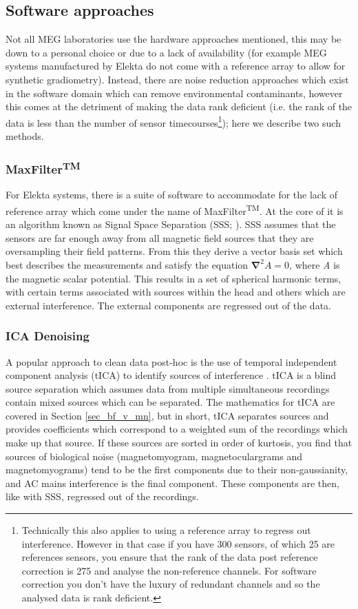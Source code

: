 \subsection{Software approaches}
Not all MEG laboratories use the hardware approaches mentioned, this may be down to a personal choice or due to a lack of availability (for example MEG systems manufactured by Elekta do not come with a reference array to allow for synthetic gradiometry). Instead, there are noise reduction approaches which exist in the software domain which can remove environmental contaminants, however this comes at the detriment of making the data rank deficient (i.e. the rank of the data is less than the number of sensor timecourses\footnote{Technically this also applies to using a reference array to regress out interference. However in that case if you have 300 sensors, of which 25 are references sensors, you ensure that the rank of the data post reference correction is 275 and analyse the non-reference channels. For software correction you don't have the luxury of redundant channels and so the analysed data is rank deficient.}); here we describe two such methods. 

\subsubsection{MaxFilter\textsuperscript{TM}}
For Elekta systems, there is a suite of software to accommodate for the lack of reference array which come under the name of MaxFilter\textsuperscript{TM}. At the core of it is an algorithm known as Signal Space Separation (SSS; \citealp{Taulu2004}). SSS assumes that the sensors are far enough away from all magnetic field sources that they are oversampling their field patterns. From this they derive a vector basis set which best describes the measurements and satisfy the equation $\mathbf{\nabla}^2A=0$, where \textit{A} is the magnetic scalar potential. This results in a set of spherical harmonic terms, with certain terms associated with sources within the head and others which are external interference. The external components are regressed out of the data. 

\subsubsection{ICA Denoising}
A popular approach to clean data post-hoc is the use of temporal independent component analysis (tICA) to identify sources of interference \citep{Mantini2007}. tICA is a blind source separation which assumes data from multiple simultaneous recordings contain mixed sources which can be separated. The mathematics for tICA are covered in Section \ref{sec_bf_v_mn}, but in short, tICA separates sources and provides coefficients which correspond to a weighted sum of the recordings which make up that source. If these sources are sorted in order of kurtosis, you find that sources of biological noise (magnetomyogram, magnetoculargrams and magnetomyograms) tend to be the first components due to their non-gaussianity, and AC mains interference is the final component. These components are then, like with SSS, regressed out of the recordings.  

